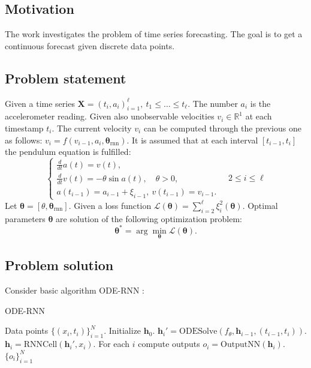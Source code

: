 \documentclass[../../main.tex]{subfiles}
\begin{document}
\subsection{Motivation}

%
%


The work investigates the problem of time series forecasting. The goal is to get a continuous forecast given discrete data points.

\subsection{Problem statement}

Given a time series $\mathbf{X} = (t_i, a_i)^{\ell}_{i=1}, ~t_1 \leq \ldots \leq t_\ell$. The number $a_i$ is the accelerometer reading. Given also unobservable velocities $v_i \in \mathbb{R}^1$ at each timestamp $t_i$. The current velocity $v_i$ can be computed through the previous one as follows: $v_i = f(v_{i-1},a_{i}, \boldsymbol\theta_\text{rnn})$. It is assumed that at each interval $[t_{i-1}, t_i]$ the pendulum equation is fulfilled:
\[
\begin{cases}
\frac{d}{dt}a(t) = v(t),\\
\frac{d}{dt}v(t) = -\theta\sin a(t), \quad \theta > 0,\\
a(t_{i-1}) = a_{i-1} + \xi_{i-1}, ~v(t_{i-1}) = v_{i-1}.
\end{cases} \quad 2 \leq i \leq \ell
\]
Let $\boldsymbol\theta = [\theta, \boldsymbol\theta_\text{rnn}]$. Given a loss function $\mathcal{L}(\boldsymbol{\theta}) = \sum_{i=2}^\ell\xi_i^2(\boldsymbol\theta)$. Optimal parameters $\boldsymbol\theta$ are solution of the following optimization problem:
\[
\boldsymbol{\theta}^* = \arg\min_{\boldsymbol{\theta}}\mathcal{L}(\boldsymbol{\theta}).
\]

\subsection{Problem solution}
Consider basic algorithm ODE-RNN \cite{NEURIPS2019_42a6845a}:
\begin{algorithm}[H]
\begin{algorithmic}
\caption{ODE-RNN}
\REQUIRE Data points $\{(x_i, t_i)\}_{i=1}^N$.
\STATE Initialize $\mathbf{h}_0$.
\STATE $\mathbf{h}_i' = \mathrm{ODESolve}(f_\theta, \mathbf{h}_{i-1}, (t_{i-1}, t_i))$.
\STATE $\mathbf{h}_i = \mathrm{RNNCell}(\mathbf{h}_i', x_i)$.
\ENDFOR
\STATE For each $i$ compute outputs $o_i = \mathrm{OutputNN}(\mathbf{h}_i)$.
\RETURN $\{o_i\}_{i=1}^N$
\end{algorithmic}
\end{algorithm}
\end{document}
